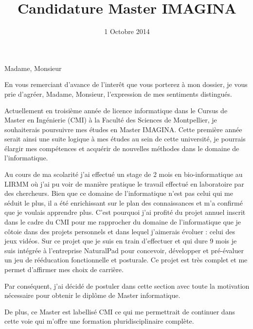 \documentclass[11pt,a4paper,sans]{moderncv}
\title{Candidature Master IMAGINA}
\begin{document}
\date{1 Octobre 2014}
\opening{Madame, Monsieur}
\closing{En vous remerciant d'avance de l'inter\^et que vous porterez à mon dossier, je vous prie d'agréer, Madame, Monsieur, l'expression de mes sentiments distingués.}
\makelettertitle

Actuellement en troisième année de licence informatique dans le Cursus de Master en Ingénierie (CMI) à la Faculté des Sciences de Montpellier, je souhaiterais poursuivre mes études en Master IMAGINA. Cette première année serait ainsi une suite logique à mes études au sein de cette université, je pourrais élargir mes compétences et acquérir de nouvelles méthodes dans le domaine de l'informatique.

Au cours de ma scolarité j'ai effectué un stage de 2 mois en bio-informatique au LIRMM où j'ai pu voir de manière pratique le travail effectué en laboratoire par des chercheurs. Bien que ce domaine de l'informatique n'est pas celui qui me séduit le plus, il a été enrichissant sur le plan des connaissances et m'a confirmé que je voulais apprendre plus.
C'est pourquoi j'ai profité du projet annuel inscrit dans le cadre du CMI pour me rapprocher du domaine de l'informatique que je côtoie dans des projets personnels et dans lequel j'aimerais évoluer : celui des jeux vidéos. Sur ce projet que je suis en train d'effectuer et qui dure 9 mois je suis intégrée à l'entreprise NaturalPad pour concevoir, développer et pré-évaluer un jeu de rééducation fonctionnelle et posturale. Ce projet est très complet et me permet d'affirmer mes choix de carrière.

Par conséquent, j'ai décidé de postuler dans cette section avec toute la motivation nécessaire pour obtenir le dipl\^ome de Master informatique.

De plus, ce Master est labellisé CMI ce qui me permettrait de continuer dans cette voie qui m'offre une formation pluridisciplinaire complète.


\makeletterclosing
\end{document}
